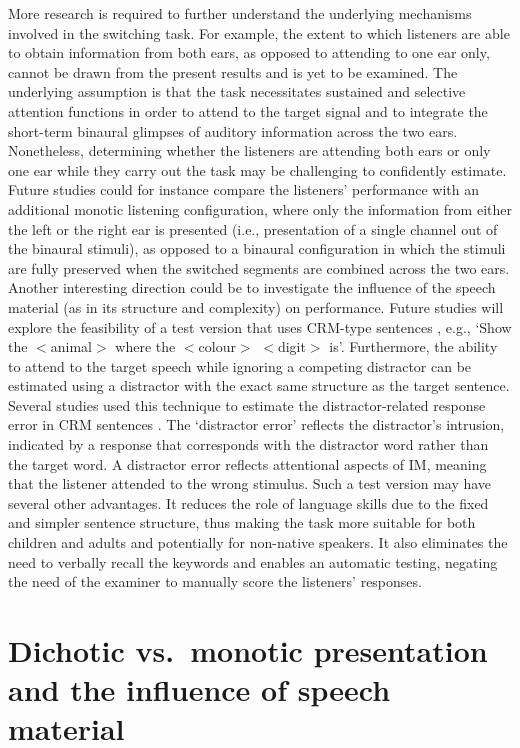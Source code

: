 \documentclass[a4paper, twoside]{templates/ociamthesis}
\begin{document}
More research is required to further understand the underlying mechanisms involved in the switching task. For example, the extent to which listeners are able to obtain information from both ears, as opposed to attending to one ear only, cannot be drawn from the present results and is yet to be examined. The underlying assumption is that the task necessitates sustained and selective attention functions in order to attend to the target signal and to integrate the short-term binaural glimpses of auditory information across the two ears. Nonetheless, determining whether the listeners are attending both ears or only one ear while they carry out the task may be challenging to confidently estimate. Future studies could for instance compare the listeners' performance with an additional monotic listening configuration, where only the information from either the left or the right ear is presented (i.e., presentation of a single channel out of the binaural stimuli), as opposed to a binaural configuration in which the stimuli are fully preserved when the switched segments are combined across the two ears.
Another interesting direction could be to investigate the influence of the speech material (as in its structure and complexity) on performance. Future studies will explore the feasibility of a test version that uses CRM-type sentences \autocite{Bolia2000}, e.g., `Show the \(<\)animal\(>\) where the \(<\)colour\(>\) \(<\)digit\(>\) is'. Furthermore, the ability to attend to the target speech while ignoring a competing distractor can be estimated using a distractor with the exact same structure as the target sentence. Several studies used this technique to estimate the distractor-related response error in CRM sentences \autocite[e.g.,][]{Brungart2001}. The `distractor error' reflects the distractor's intrusion, indicated by a response that corresponds with the distractor word rather than the target word. A distractor error reflects attentional aspects of IM, meaning that the listener attended to the wrong stimulus. Such a test version may have several other advantages. It reduces the role of language skills due to the fixed and simpler sentence structure, thus making the task more suitable for both children and adults and potentially for non-native speakers. It also eliminates the need to verbally recall the keywords and enables an automatic testing, negating the need of the examiner to manually score the listeners' responses.\\

\hypertarget{dichotic-vs.-monotic-presentation-and-the-influence-of-speech-material}{%
\section{Dichotic vs.~monotic presentation and the influence of speech material}\label{dichotic-vs.-monotic-presentation-and-the-influence-of-speech-material}}
\end{document}
